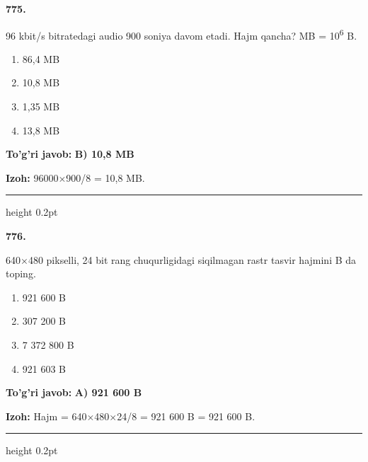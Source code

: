 \documentclass[10pt,a4paper,oneside]{article}
\begin{document}
\noindent\textbf{\color{ink}775.}
\par
96 kbit/s bitratedagi audio 900 soniya davom etadi. Hajm qancha? MB = 10\textsuperscript{6} B.
\begin{enumerate}[label=\Alph*),leftmargin=9mm]
\item 86,4 MB
\item 10,8 MB
\item 1,35 MB
\item 13,8 MB
\end{enumerate}
\begin{tcolorbox}[enhanced,breakable,colback=teal!4,colframe=teal!50!black,boxrule=0.5pt,arc=1.1mm,left=3mm,right=3mm,top=1.7mm,bottom=1.7mm,before skip=2mm,after skip=2mm]
\textbf{\color{teal}To'g'ri javob:} \textbf{B) 10,8 MB}
\par\smallskip
\textbf{Izoh:} 96000\ensuremath{\times}900/8 = 10,8 MB.
\end{tcolorbox}
\vspace{2mm}\hrule height 0.2pt \vspace{3mm}

\noindent\textbf{\color{ink}776.}
\par
640\ensuremath{\times}480 pikselli, 24 bit rang chuqurligidagi siqilmagan rastr tasvir hajmini B da toping.
\begin{enumerate}[label=\Alph*),leftmargin=9mm]
\item 921 600 B
\item 307 200 B
\item 7 372 800 B
\item 921 603 B
\end{enumerate}
\begin{tcolorbox}[enhanced,breakable,colback=teal!4,colframe=teal!50!black,boxrule=0.5pt,arc=1.1mm,left=3mm,right=3mm,top=1.7mm,bottom=1.7mm,before skip=2mm,after skip=2mm]
\textbf{\color{teal}To'g'ri javob:} \textbf{A) 921 600 B}
\par\smallskip
\textbf{Izoh:} Hajm = 640\ensuremath{\times}480\ensuremath{\times}24/8 = 921 600 B = 921 600 B.
\end{tcolorbox}
\vspace{2mm}\hrule height 0.2pt \vspace{3mm}
\end{document}
